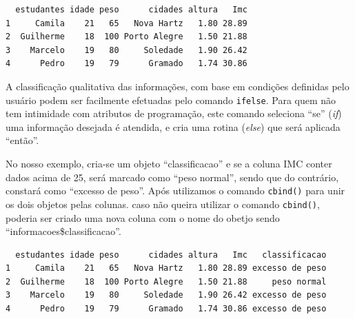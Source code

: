 \documentclass[12pt,brazil,]{book}
\newenvironment{Shaded}{\begin{snugshade}}{\end{snugshade}}
\newcommand{\CommentTok}[1]{\textcolor[rgb]{0.56,0.35,0.01}{\textit{#1}}}
\newcommand{\DecValTok}[1]{\textcolor[rgb]{0.00,0.00,0.81}{#1}}
\newcommand{\KeywordTok}[1]{\textcolor[rgb]{0.13,0.29,0.53}{\textbf{#1}}}
\newcommand{\NormalTok}[1]{#1}
\newcommand{\OperatorTok}[1]{\textcolor[rgb]{0.81,0.36,0.00}{\textbf{#1}}}
\newcommand{\StringTok}[1]{\textcolor[rgb]{0.31,0.60,0.02}{#1}}
\begin{document}
\begin{Shaded}
\end{Shaded}

\begin{verbatim}
  estudantes idade peso      cidades altura   Imc
1     Camila    21   65   Nova Hartz   1.80 28.89
2  Guilherme    18  100 Porto Alegre   1.50 21.88
3    Marcelo    19   80     Soledade   1.90 26.42
4      Pedro    19   79      Gramado   1.74 30.86
\end{verbatim}

A classificação qualitativa das informações, com base em condições
definidas pelo usuário podem ser facilmente efetuadas pelo comando
\texttt{ifelse}. Para quem não tem intimidade com atributos de
programação, este comando seleciona ``se'' (\emph{if}) uma informação
desejada é atendida, e cria uma rotina (\emph{else}) que será aplicada
``então''.

No nosso exemplo, cria-se um objeto ``classificacao'' e se a coluna IMC
conter dados acima de 25, será marcado como ``peso normal'', sendo que
do contrário, constará como ``excesso de peso''. Após utilizamos o
comando \texttt{cbind()} para unir os dois objetos pelas colunas. caso
não queira utilizar o comando \texttt{cbind()}, poderia ser criado uma
nova coluna com o nome do obetjo sendo ``informacoes\$classificacao''.

\begin{Shaded}
\end{Shaded}

\begin{verbatim}
  estudantes idade peso      cidades altura   Imc   classificacao
1     Camila    21   65   Nova Hartz   1.80 28.89 excesso de peso
2  Guilherme    18  100 Porto Alegre   1.50 21.88     peso normal
3    Marcelo    19   80     Soledade   1.90 26.42 excesso de peso
4      Pedro    19   79      Gramado   1.74 30.86 excesso de peso
\end{verbatim}
\end{document}
